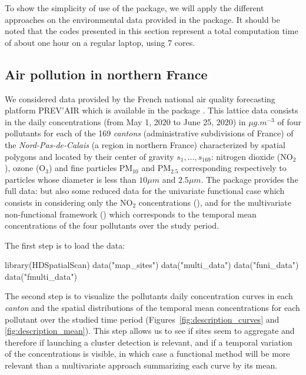 To show the simplicity of use of the package, we will apply the different approaches on the environmental data provided in the package. It should be noted that the codes presented in this section represent a total computation time of about one hour on a regular laptop, using 7 cores.


\subsection{Air pollution in northern France}\label{subsec:airpollution}

\noindent We considered data provided by the French national air quality forecasting platform PREV'AIR which is available in the package . This lattice data consists in  the daily concentrations (from May 1, 2020 to June 25, 2020) in $\mu g.m^{-3}$ of four pollutants for each of the 169 \textit{cantons} (administrative subdivisions of France) of the \textit{Nord-Pas-de-Calais} (a region in northern France) characterized by spatial polygons and located by their center of gravity $s_1, \dots, s_{169}$: nitrogen dioxide ($\text{NO}_2$), ozone ($\text{O}_3$) and fine particles $\text{PM}_{10}$ and $\text{PM}_{2.5}$ corresponding respectively to particles whose diameter is less than $10 \mu m$ and $2.5 \mu m$. The package  provides the full data:  but also some reduced data for the univariate functional case which consists in considering only the $\text{NO}_2$ concentrations (), and for the multivariate non-functional framework () which corresponds to the temporal mean concentrations of the four pollutants over the study period.


\noindent The first step is to load the data:
\begin{example}
 library(HDSpatialScan)
 data("map_sites")
 data("multi_data")
 data("funi_data")
 data("fmulti_data")
\end{example}

\noindent The second step is to visualize the pollutants daily concentration curves in each \textit{canton} and the spatial distributions of the temporal mean concentrations for each pollutant over the studied time period (Figures~\ref{fig:description_curves} and \ref{fig:description_mean}). This step allows us to see if sites seem to aggregate and therefore if launching a cluster detection is relevant, and if a temporal variation of the concentrations is visible, in which case a functional method will be more relevant than a multivariate approach summarizing each curve by its mean.

